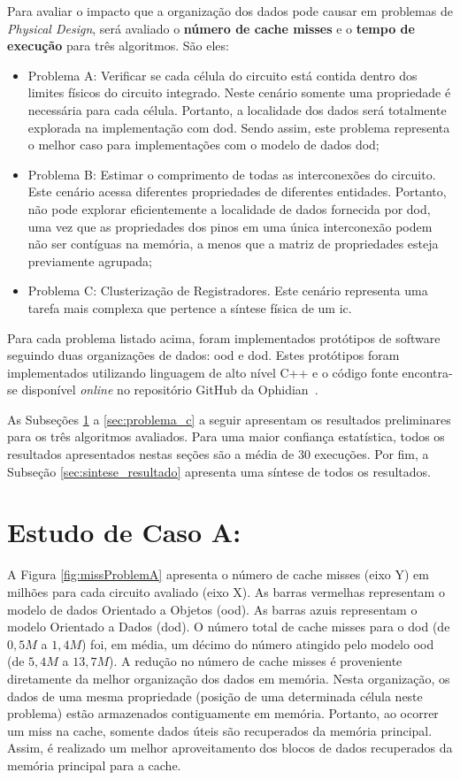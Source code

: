 Para avaliar o impacto que a organização dos dados pode causar em problemas de \textit{Physical Design}, será avaliado o \textbf{número de cache misses} e o \textbf{tempo de execução} para três algoritmos. São eles:
\begin{itemize}
    \item Problema A: Verificar se cada célula do circuito está contida dentro dos  limites físicos do circuito integrado. Neste cenário somente uma propriedade é necessária para cada célula. Portanto, a localidade dos dados será totalmente explorada na implementação com \ac{dod}. Sendo assim, este problema representa o melhor caso para implementações com o modelo de dados \ac{dod};
    \item Problema B: Estimar o comprimento de todas as interconexões do circuito. Este cenário acessa diferentes propriedades de diferentes entidades. Portanto, não pode explorar eficientemente a localidade de dados fornecida por \ac {dod}, uma vez que as propriedades dos pinos em uma única interconexão podem não ser contíguas na memória, a menos que a matriz de propriedades esteja previamente agrupada;
    \item Problema C: Clusterização de Registradores. Este cenário representa uma tarefa mais complexa que pertence a síntese física de um \ac{ic}.
\end{itemize}

Para cada problema listado acima, foram implementados protótipos de software seguindo duas organizações de dados: \ac{ood} e \ac{dod}.
Estes protótipos foram implementados utilizando linguagem de alto nível C++ e o código fonte encontra-se disponível \textit{online} no repositório GitHub da Ophidian~\cite{ophidian}.

As Subseções \ref{sec:problema_a} a \ref{sec:problema_c} a seguir apresentam os resultados preliminares para os três algoritmos avaliados.
Para uma maior confiança estatística, todos os resultados apresentados nestas seções são a média de 30 execuções.
Por fim, a Subseção \ref{sec:sintese_resultado} apresenta uma síntese de todos os resultados.

\section{Estudo de Caso A:}
\label{sec:problema_a}

A Figura \ref{fig:missProblemA} apresenta o número de cache misses (eixo Y) em milhões para cada circuito avaliado (eixo X). As barras vermelhas representam o modelo de dados Orientado a Objetos (\ac{ood}). As barras azuis representam o modelo Orientado a Dados (\ac{dod}). O número total de cache misses para o \ac{dod} (de $0,5M$ a $1,4M$) foi, em média, um décimo do número atingido pelo modelo \ac{ood} (de $5,4M$ a $13,7M$). A redução no número de cache misses é proveniente diretamente da melhor organização dos dados em memória. Nesta organização, os dados de uma mesma propriedade (posição de uma determinada célula neste problema) estão armazenados contiguamente em memória. Portanto, ao ocorrer um miss na cache, somente dados úteis são recuperados da memória principal. Assim, é realizado um melhor aproveitamento dos blocos de dados recuperados da memória principal para a cache.

